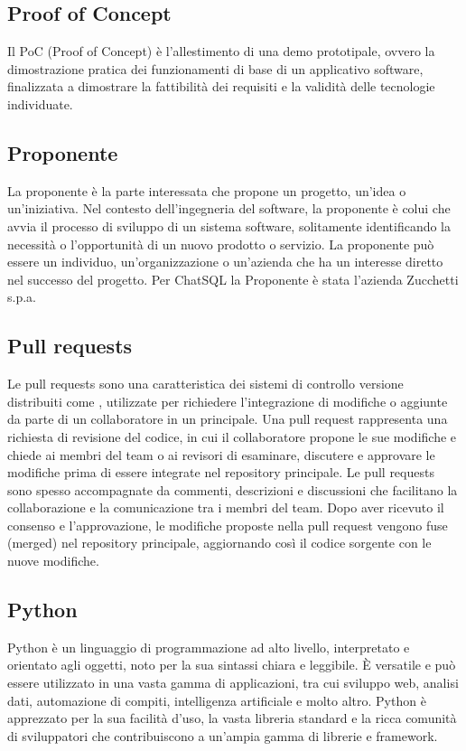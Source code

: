 \vspace{2em}
\subsection*{Proof of Concept}
Il PoC (Proof of Concept) è l’allestimento di una demo prototipale, ovvero la dimostrazione pratica dei funzionamenti di base di un applicativo software, finalizzata a dimostrare la fattibilità dei requisiti e la validità delle tecnologie individuate.

\vspace{2em}
\subsection*{Proponente}
La proponente è la parte interessata che propone un progetto, un'idea o un'iniziativa. Nel contesto dell'ingegneria del software, la proponente è colui che avvia il processo di sviluppo di un sistema software, solitamente identificando la necessità o l'opportunità di un nuovo prodotto o servizio. La proponente può essere un individuo, un'organizzazione o un'azienda che ha un interesse diretto nel successo del progetto. Per ChatSQL la Proponente è stata l'azienda Zucchetti s.p.a.

\vspace{2em}
\subsection*{Pull requests}
Le pull requests sono una caratteristica dei sistemi di controllo versione distribuiti come , utilizzate per richiedere l'integrazione di modifiche o aggiunte da parte di un collaboratore in un  principale. Una pull request rappresenta una richiesta di revisione del codice, in cui il collaboratore propone le sue modifiche e chiede ai membri del team o ai revisori di esaminare, discutere e approvare le modifiche prima di essere integrate nel repository principale. Le pull requests sono spesso accompagnate da commenti, descrizioni e discussioni che facilitano la collaborazione e la comunicazione tra i membri del team. Dopo aver ricevuto il consenso e l'approvazione, le modifiche proposte nella pull request vengono fuse (merged) nel repository principale, aggiornando così il codice sorgente con le nuove modifiche.

\vspace{2em}
\subsection*{Python}
Python è un linguaggio di programmazione ad alto livello, interpretato e orientato agli oggetti, noto per la sua sintassi chiara e leggibile. È versatile e può essere utilizzato in una vasta gamma di applicazioni, tra cui sviluppo web, analisi dati, automazione di compiti, intelligenza artificiale e molto altro. Python è apprezzato per la sua facilità d'uso, la vasta libreria standard e la ricca comunità di sviluppatori che contribuiscono a un'ampia gamma di librerie e framework.
